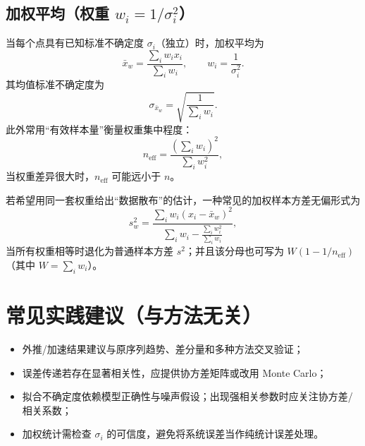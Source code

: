 \documentclass[UTF8,a4paper,11pt]{ctexart}
\begin{document}
\subsection{加权平均（权重 $w_i=1/\sigma_i^2$）}

当每个点具有已知标准不确定度 $\sigma_i$（独立）时，加权平均为
\begin{equation}
\bar{x}_w=\frac{\sum_i w_i x_i}{\sum_i w_i},\qquad w_i=\frac{1}{\sigma_i^2}.
\end{equation}
其均值标准不确定度为
\begin{equation}
\sigma_{\bar{x}_w}=\sqrt{\frac{1}{\sum_i w_i}}.
\end{equation}
此外常用“有效样本量”衡量权重集中程度：
\begin{equation}
n_{\mathrm{eff}}=\frac{\left(\sum_i w_i\right)^2}{\sum_i w_i^2},
\end{equation}
当权重差异很大时，$n_{\mathrm{eff}}$ 可能远小于 $n$。

若希望用同一套权重给出“数据散布”的估计，一种常见的加权样本方差无偏形式为
\begin{equation}
s_w^2=\frac{\sum_i w_i(x_i-\bar{x}_w)^2}{\sum_i w_i-\frac{\sum_i w_i^2}{\sum_i w_i}},
\end{equation}
当所有权重相等时退化为普通样本方差 $s^2$；并且该分母也可写为 $W(1-1/n_{\mathrm{eff}})$（其中 $W=\sum_i w_i$）。

\section{常见实践建议（与方法无关）}
\begin{itemize}
  \item 外推/加速结果建议与原序列趋势、差分量和多种方法交叉验证；
  \item 误差传递若存在显著相关性，应提供协方差矩阵或改用 Monte Carlo；
  \item 拟合不确定度依赖模型正确性与噪声假设；出现强相关参数时应关注协方差/相关系数；
  \item 加权统计需检查 $\sigma_i$ 的可信度，避免将系统误差当作纯统计误差处理。
\end{itemize}
\end{document}
